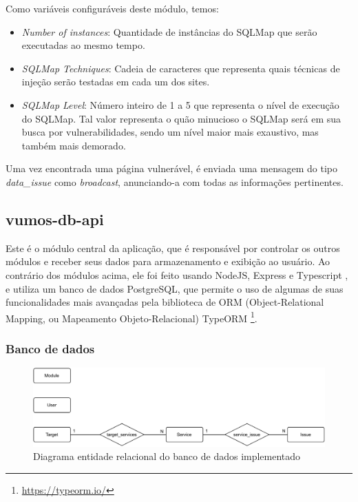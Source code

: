     Como variáveis configuráveis deste módulo, temos:
    \begin{itemize}
        \item \emph{Number of instances}: Quantidade de instâncias do SQLMap que serão executadas ao mesmo tempo.
        \item \emph{SQLMap Techniques}: Cadeia de caracteres que representa quais técnicas de injeção serão testadas em cada um dos sites.
        \item \emph{SQLMap Level}: Número inteiro de 1 a 5 que representa o nível de execução do SQLMap. Tal valor representa o quão minucioso o SQLMap será em sua busca por vulnerabilidades, sendo um nível maior mais exaustivo, mas também mais demorado.
    \end{itemize}
    
    Uma vez encontrada uma página vulnerável, é enviada uma mensagem do tipo \textit{data\_issue} como \textit{broadcast}, anunciando-a com todas as informações pertinentes. 


    \subsection{vumos-db-api}
    
    Este é o módulo central da aplicação, que é responsável por controlar os outros módulos e receber seus dados para armazenamento e exibição ao usuário. Ao contrário dos módulos acima, ele foi feito usando NodeJS, Express e Typescript , e utiliza um banco de dados PostgreSQL, que permite o uso de algumas de suas funcionalidades mais avançadas pela biblioteca de ORM (Object-Relational Mapping, ou Mapeamento Objeto-Relacional) TypeORM \footnote{\url{https://typeorm.io/}}. 
    
    \subsubsection{Banco de dados}
    
    \begin{figure}[H]
        \includegraphics[scale=0.8]{figuras/vumos-db-api-mer.drawio.pdf}
        \caption{Diagrama entidade relacional do banco de dados implementado \label{fig:vumos-db-mer}}
    \end{figure}
    
